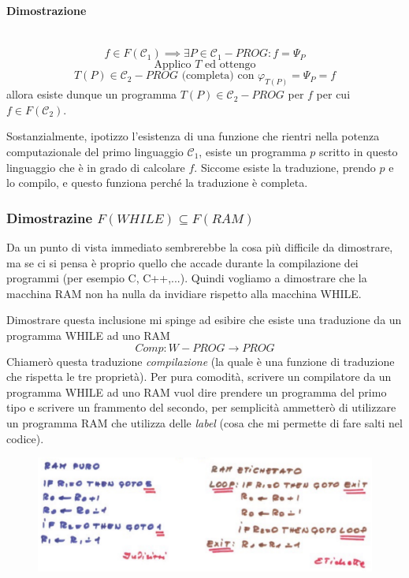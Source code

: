 \documentclass{article}
\begin{document}
\paragraph{Dimostrazione}\mbox{}\\
$$f\in F(\mathcal{C}_1)\implies\exists P\in\mathcal{C}_1-PROG:f=\Psi_P$$
$$\text{Applico } T \text{ ed ottengo}$$
$$T(P)\in\mathcal{C}_2-PROG\text{ (completa) con }\varphi_{T(P)}=\Psi_P=f$$
allora esiste dunque un programma $T(P)\in\mathcal{C}_2-PROG$ per $f$ per cui
$f\in F(\mathcal{C}_2)$.

Sostanzialmente, ipotizzo l'esistenza di una funzione che rientri nella potenza computazionale
del primo linguaggio $\mathcal{C}_1$,
esiste un programma $p$ scritto in questo linguaggio che è in grado di calcolare $f$.
Siccome esiste la traduzione, prendo $p$ e lo compilo, e questo funziona perché la traduzione è completa.

\subsubsection{Dimostrazine $F(WHILE)\subseteq F(RAM)$}
Da un punto di vista immediato sembrerebbe la cosa più difficile da dimostrare, ma se ci si pensa
è proprio quello che accade durante la compilazione dei programmi (per esempio C, C++,...).
Quindi vogliamo a dimostrare che la macchina RAM non ha nulla da invidiare rispetto alla macchina WHILE.

Dimostrare questa inclusione mi spinge ad esibire che esiste una traduzione da un programma WHILE ad
uno RAM
$$Comp:W-PROG\rightarrow PROG$$
Chiamerò questa traduzione \textit{compilazione} (la quale è una funzione di traduzione che
rispetta le tre proprietà). Per pura comodità, scrivere un compilatore da un programma WHILE ad uno
RAM vuol dire prendere un programma del primo tipo e scrivere un frammento del secondo, per semplicità
ammetterò di utilizzare un programma RAM che utilizza delle \textit{label} (cosa che mi permette
di fare salti nel codice).

\begin{figure}[H]
    \centering
    \includegraphics[scale=0.4]{images/ram_etichettato.png}
\end{figure}
\end{document}

